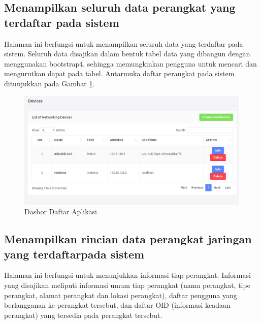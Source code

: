 		\subsection{Menampilkan seluruh data perangkat yang terdaftar pada sistem}
        	Halaman ini berfungsi untuk menampilkan seluruh data yang terdaftar pada sistem. Seluruh data disajikan dalam bentuk tabel data yang dibangun dengan menggunakan bootstrap4, sehingga memungkinkan pengguna untuk mencari dan mengurutkan dapat pada tabel. Antarmuka daftar perangkat pada sistem ditunjukkan pada Gambar \ref{antarmuka:daftarperangkat}.
			\begin{figure}[H]
				\centering
				\includegraphics[width=11.2cm]{Images/C-4/antarmukadaftarperangkat.png}
				\caption{Dasbor Daftar Aplikasi}
				\label{antarmuka:daftarperangkat}
			\end{figure}
            
         \subsection{Menampilkan rincian data perangkat jaringan yang terdaftarpada sistem}
         	Halaman ini berfungsi untuk menunjukkan informasi tiap perangkat. Informasi yang disajikan meliputi informasi umum tiap perangkat (nama perangkat, tipe perangkat, alamat perangkat dan lokasi perangkat), daftar pengguna yang berlangganan ke perangkat tersebut, dan daftar OID (informasi keadaan perangkat) yang tersedia pada perangkat tersebut.
         	
